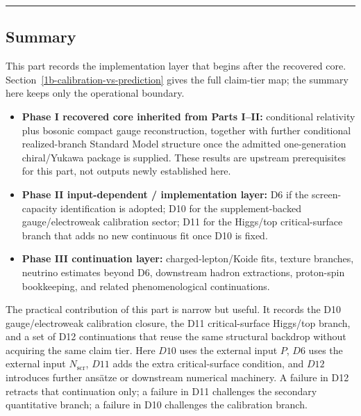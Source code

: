 \begin{center}\rule{0.5\linewidth}{0.5pt}\end{center}

\subsection{Summary}\label{summary}

This part records the implementation layer that begins after the recovered core. Section~\ref{1b-calibration-vs-prediction} gives the full claim-tier map; the summary here keeps only the operational boundary.

\begin{itemize}
\item \textbf{Phase I recovered core inherited from Parts I--II:} conditional relativity plus bosonic compact gauge reconstruction, together with further conditional realized-branch Standard Model structure once the admitted one-generation chiral/Yukawa package is supplied. These results are upstream prerequisites for this part, not outputs newly established here.
\item \textbf{Phase II input-dependent / implementation layer:} D6 if the screen-capacity identification is adopted; D10 for the supplement-backed gauge/electroweak calibration sector; D11 for the Higgs/top critical-surface branch that adds no new continuous fit once D10 is fixed.
\item \textbf{Phase III continuation layer:} charged-lepton/Koide fits, texture branches, neutrino estimates beyond D6, downstream hadron extractions, proton-spin bookkeeping, and related phenomenological continuations.
\end{itemize}

The practical contribution of this part is narrow but useful. It records the D10 gauge/electroweak calibration closure, the D11 critical-surface Higgs/top branch, and a set of D12 continuations that reuse the same structural backdrop without acquiring the same claim tier. Here \(D10\) uses the external input \(P\), \(D6\) uses the external input \(N_{\mathrm{scr}}\), \(D11\) adds the extra critical-surface condition, and \(D12\) introduces further ans\"atze or downstream numerical machinery. A failure in D12 retracts that continuation only; a failure in D11 challenges the secondary quantitative branch; a failure in D10 challenges the calibration branch.

